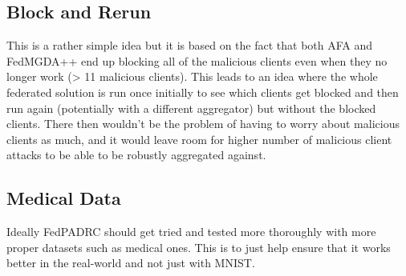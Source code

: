 \subsection{Block and Rerun}
This is a rather simple idea but it is based on the fact that both AFA and FedMGDA++ end up blocking all of the malicious clients even when they no longer work (> 11 malicious clients).
This leads to an idea where the whole federated solution is run once initially to see which clients get blocked and then run again (potentially with a different aggregator) but without the blocked clients.
There then wouldn't be the problem of having to worry about malicious clients as much, and it would leave room for higher number of malicious client attacks to be able to be robustly aggregated against.


\subsection{Medical Data}
Ideally FedPADRC should get tried and tested more thoroughly with more proper datasets such as medical ones.
This is to just help ensure that it works better in the real-world and not just with MNIST.
